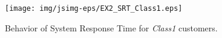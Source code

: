 \begin{figure}[htb]
    \begin{center}
        \texttt{[image: img/jsimg-eps/EX2\_SRT\_Class1.eps]}
    \end{center}
    \caption{Behavior of System Response Time for \emph{Class1} customers.}
    \label{fig:respcl1}
\end{figure}

